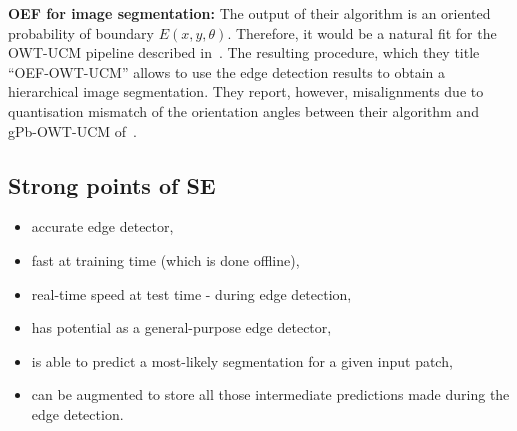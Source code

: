 \textbf{OEF for image segmentation:} The output of their algorithm is an oriented probability of boundary $E(x,y,\theta)$. Therefore, it would be a natural fit for the OWT-UCM pipeline described in~\cite{Arbelaez11}. The resulting procedure, which they title ``OEF-OWT-UCM'' allows to use the edge detection results to obtain a hierarchical image segmentation. They report, however, misalignments due to quantisation mismatch of the orientation angles between their algorithm and gPb-OWT-UCM of~\cite{Arbelaez11}.

\subsection{Strong points of SE}

\begin{itemize}
 \item accurate edge detector,
 \item fast at training time (which is done offline),
 \item real-time speed at test time - during edge detection,
 \item has potential as a general-purpose edge detector, %
 \item is able to predict a most-likely segmentation for a given input patch,
 \item can be augmented to store all those intermediate predictions made during the edge detection.
\end{itemize}

